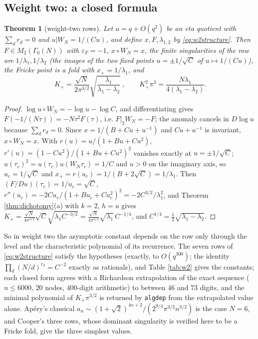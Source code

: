 \documentclass[11pt]{amsart}
\newtheorem{theorem}{Theorem}[section]
\theoremstyle{definition}
\theoremstyle{remark}
\begin{document}
\subsection{Weight two: a closed formula}
\begin{theorem}[weight-two rows]\label{thm:w2}
Let $u=q+O(q^2)$ be an eta quotient with $\sum_dr_d=0$ and $u|W_N=1/(Cu)$, and define $x,F,\lambda_{1,2}$ by \eqref{eq:w2structure}. Then $F\in M_2(\Gamma_0(N))$ with $\varepsilon_F=-1$, $x\circ W_N=x$, the finite singularities of the row are $1/\lambda_1,1/\lambda_2$ (the images of the two fixed points $u=\pm1/\sqrt C$ of $u\mapsto1/(Cu)$), the Fricke point is a fold with $x_+=1/\lambda_1$, and
$$\boxed{\ K_+=\frac{\sqrt N}{2\pi^{3/2}}\sqrt{\frac{\lambda_1}{\lambda_1-\lambda_2}}\ },\qquad K_+^2\pi^3=\frac{N\lambda_1}{4(\lambda_1-\lambda_2)} .$$
\end{theorem}
\begin{proof}
$\log u\circ W_N=-\log u-\log C$, and differentiating gives $F(-1/(N\tau))=-N\tau^2F(\tau)$, i.e. $F|_2W_N=-F$; the anomaly cancels in $D\log u$ because $\sum_dr_d=0$. Since $x=1/(B+Cu+u^{-1})$ and $Cu+u^{-1}$ is invariant, $x\circ W_N=x$. With $r(u)=u/(1+Bu+Cu^2)$, $r'(u)=(1-Cu^2)/(1+Bu+Cu^2)^2$ vanishes exactly at $u=\pm1/\sqrt C$; $u(\tau_c)^2=u(\tau_c)u(W_N\tau_c)=1/C$ and $u>0$ on the imaginary axis, so $u_c=1/\sqrt C$ and $x_+=r(u_c)=1/(B+2\sqrt C)=1/\lambda_1$. Then $(F/Du)(\tau_c)=1/u_c=\sqrt C$, $r''(u_c)=-2Cu_c/(1+Bu_c+Cu_c^2)^2=-2C^{3/2}/\lambda_1^2$, and Theorem \ref{thm:dichotomy}(a) with $k=2$, $h=u$ gives $K_+=\frac{\sqrt N}{4\pi^{3/2}}\sqrt C\sqrt{\lambda_1C^{-3/2}}=\frac{\sqrt N}{4\pi^{3/2}}\sqrt{\lambda_1}\,C^{-1/4}$, and $C^{1/4}=\frac12\sqrt{\lambda_1-\lambda_2}$.
\end{proof}

So in weight two the asymptotic constant depends on the row only through the level and the characteristic polynomial of its recurrence. The seven rows of \eqref{eq:w2structure} satisfy the hypotheses (exactly, to $O(q^{300})$; the identity $\prod_d(N/d)^{r_d}=C^{-2}$ exactly as rationals), and Table \ref{tab:w2} gives the constants; each closed form agrees with a Richardson extrapolation of the exact sequence ($n\le6000$, $20$ nodes, $400$-digit arithmetic) to between $46$ and $73$ digits, and the minimal polynomial of $K_+\pi^{3/2}$ is returned by \texttt{algdep} from the extrapolated value alone. Ap\'ery's classical $a_n\sim(1+\sqrt2)^{4n+2}/(2^{9/4}\pi^{3/2}n^{3/2})$ is the case $N=6$, and Cooper's three rows, whose dominant singularity is verified here to be a Fricke fold, give the three simplest values.
\end{document}
